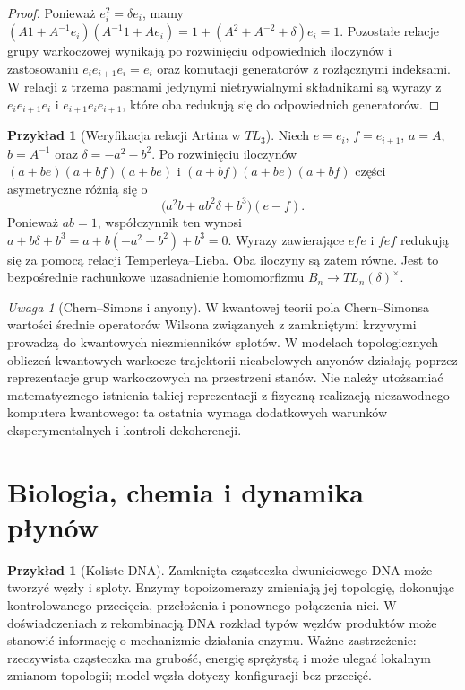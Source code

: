 \documentclass[11pt,a4paper]{report}
\numberwithin{equation}{section}
\theoremstyle{plain}
\theoremstyle{definition}
\newtheorem{przyklad}[twierdzenie]{Przykład}
\theoremstyle{remark}
\newtheorem{uwaga}[twierdzenie]{Uwaga}
\begin{document}
\begin{proof}
Ponieważ $e_i^2=\delta e_i$, mamy
$(A1+A^{-1}e_i)(A^{-1}1+Ae_i)
=1+(A^2+A^{-2}+\delta)e_i=1$.
Pozostałe relacje grupy warkoczowej wynikają po
rozwinięciu odpowiednich iloczynów i zastosowaniu
$e_ie_{i+1}e_i=e_i$ oraz komutacji generatorów
z rozłącznymi indeksami. W relacji z trzema pasmami
jedynymi nietrywialnymi składnikami są wyrazy
z $e_ie_{i+1}e_i$ i $e_{i+1}e_ie_{i+1}$, które
oba redukują się do odpowiednich generatorów.
\end{proof}

\begin{przyklad}[Weryfikacja relacji Artina w $TL_3$]
Niech $e=e_i$, $f=e_{i+1}$, $a=A$, $b=A^{-1}$ oraz
$\delta=-a^2-b^2$. Po rozwinięciu iloczynów
$(a+be)(a+bf)(a+be)$ i $(a+bf)(a+be)(a+bf)$
części asymetryczne różnią się o
\[
\bigl(a^2b+ab^2\delta+b^3\bigr)(e-f).
\]
Ponieważ $ab=1$, współczynnik ten wynosi
$a+b\delta+b^3=a+b(-a^2-b^2)+b^3=0$.
Wyrazy zawierające $efe$ i $fef$ redukują się za pomocą
relacji Temperleya--Lieba. Oba iloczyny są zatem równe.
Jest to bezpośrednie rachunkowe uzasadnienie homomorfizmu
$B_n\to TL_n(\delta)^\times$.
\end{przyklad}

\begin{uwaga}[Chern--Simons i anyony]
W kwantowej teorii pola Chern--Simonsa wartości średnie
operatorów Wilsona związanych z zamkniętymi krzywymi
prowadzą do kwantowych niezmienników splotów. W modelach
topologicznych obliczeń kwantowych warkocze trajektorii
nieabelowych anyonów działają poprzez reprezentacje
grup warkoczowych na przestrzeni stanów.
Nie należy utożsamiać matematycznego istnienia takiej
reprezentacji z fizyczną realizacją niezawodnego
komputera kwantowego: ta ostatnia wymaga dodatkowych
warunków eksperymentalnych i kontroli dekoherencji.
\end{uwaga}

\section{Biologia, chemia i dynamika płynów}
\label{sec:kt-zastosowania}

\begin{przyklad}[Koliste DNA]
Zamknięta cząsteczka dwuniciowego DNA może tworzyć
węzły i sploty. Enzymy topoizomerazy zmieniają jej
topologię, dokonując kontrolowanego przecięcia,
przełożenia i ponownego połączenia nici. W doświadczeniach
z rekombinacją DNA rozkład typów węzłów produktów
może stanowić informację o mechanizmie działania enzymu.
Ważne zastrzeżenie: rzeczywista cząsteczka ma grubość,
energię sprężystą i może ulegać lokalnym zmianom topologii;
model węzła dotyczy konfiguracji bez przecięć.
\end{przyklad}
\end{document}
